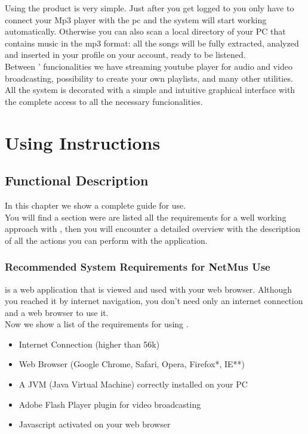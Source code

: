 Using the product is very simple. Just after you get logged to  you
only have to connect your Mp3 player with the pc and the system will start
working automatically. Otherwise you can also scan a local directory of your PC
that contains music in the mp3 format: all the songs will be fully extracted,
analyzed and inserted in your profile on your  account, ready to be
listened.\\

Between ' funcionalities we have streaming youtube player for audio
and video broadcasting, possibility to create your own playlists, and many other
utilities.\\

All the system is decorated with a simple and intuitive graphical interface
with the complete access to all the necessary funcionalities.\\

\chapter{Using Instructions}
\thispagestyle{fancy}

\section{Functional Description}
In this chapter we show a complete guide for  use.\\
You will find a section were are listed all the requirements for a well
working approach with , then you will encounter a detailed overview
with the description of all the actions you can perform with the
application.

\subsection{Recommended System Requirements for NetMus Use}
 is a web application that is viewed and used with your web browser.
Although you reached it by internet navigation, you don't need only an internet
connection and a web browser to use it.\\

Now we show a list of the requirements for using .

\begin{itemize}
  \item Internet Connection (higher than 56k)
  \item Web Browser (Google Chrome, Safari, Opera, Firefox*, IE**)
  \item A JVM (Java Virtual Machine) correctly installed on your PC
  \item Adobe Flash Player plugin for video broadcasting
  \item Javascript activated on your web browser
\end{itemize}

